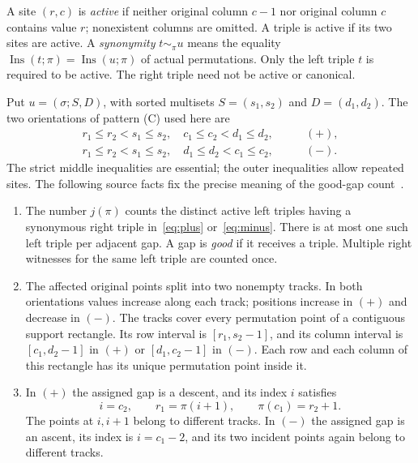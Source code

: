\documentclass[11pt,a4paper]{article}
\theoremstyle{remark}
\newcommand{\Ins}{\operatorname{Ins}}
\begin{document}
A site $(r,c)$ is \emph{active} if neither original column $c-1$ nor
original column $c$ contains value $r$; nonexistent columns are omitted.
A triple is active if its two sites are active. A \emph{synonymity}
$t\sim_\pi u$ means the equality $\Ins(t;\pi)=\Ins(u;\pi)$ of actual
permutations. Only the left triple $t$ is required to be active.
The right triple need not be active or canonical.

Put $u=(\sigma;S,D)$, with sorted multisets $S=(s_1,s_2)$ and
$D=(d_1,d_2)$. The two orientations of pattern (C) used here are
\begin{align}
 r_1\le r_2<s_1\le s_2,\quad c_1\le c_2<d_1\le d_2,
 &\qquad (+),\label{eq:plus}\\
 r_1\le r_2<s_1\le s_2,\quad d_1\le d_2<c_1\le c_2,
 &\qquad (-).\label{eq:minus}
\end{align}
The strict middle inequalities are essential; the outer inequalities
allow repeated sites. The following source facts fix the precise
meaning of the good-gap count~\cite[Proposition~6.3, Theorem~6.4,
Proposition~8.5, Corollary~8.6 and Theorem~8.7]{raywest}.

\begin{enumerate}
\item The number $j(\pi)$ counts the distinct active left triples having
a synonymous right triple in~\eqref{eq:plus} or~\eqref{eq:minus}.
There is at most one such left triple per adjacent gap. A gap is
\emph{good} if it receives a triple. Multiple right witnesses for the
same left triple are counted once.
\item The affected original points split into two nonempty tracks. In
both orientations values increase along each track; positions increase
in $(+)$ and decrease in $(-)$. The tracks cover every permutation
point of a contiguous support rectangle. Its row interval is
$[r_1,s_2-1]$, and its column interval is $[c_1,d_2-1]$ in $(+)$ or
$[d_1,c_2-1]$ in $(-)$. Each row and each column of this rectangle
has its unique permutation point inside it.
\item In $(+)$ the assigned gap is a descent, and its index $i$ satisfies
\begin{equation}\label{eq:source}
 i=c_2,\qquad r_1=\pi(i+1),\qquad \pi(c_1)=r_2+1.
\end{equation}
The points at $i,i+1$ belong to different tracks. In $(-)$ the assigned
gap is an ascent, its index is $i=c_1-2$, and its two incident points
again belong to different tracks.
\end{enumerate}
\end{document}
